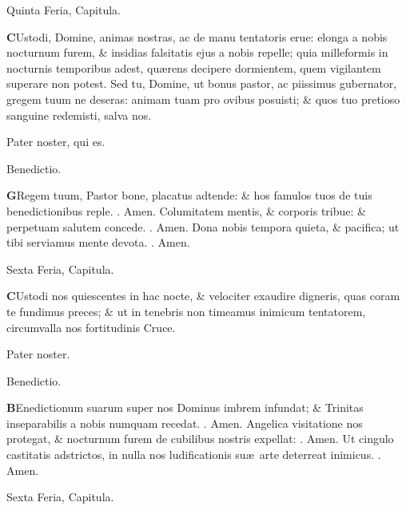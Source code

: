 \documentclass[letter,11pt]{book}
\makeatletter
\DeclareRobustCommand{\Rbar}{\vers@resp{0pt}{R}}
\newcommand{\vers@resp@sym}{\raisebox{0.2ex}{\rotatebox[origin=c]{-20}{$\m@th\rceil$}}}
\newcommand{\vers@resp}[2]{%
  {\ooalign{\hidewidth\kern#1\vers@resp@sym\hidewidth\cr#2\cr}}%
}%
\def\R{\color{Red} \Rbar . \color{black}}
\makeatother
\begin{document}
\begin{multicols*}{2}
\vspace{-.5em} \begin{center} \color{Red} Quinta Feria, Capitula. \end{center} \vspace{-.5em}
\lettrine[lines=2]{\bfseries \color{Red} C}{}Ustodi, Domine, animas nostras, ac de manu tentatoris erue: elonga a nobis nocturnum furem, \& insidias falsitatis ejus a nobis repelle; quia milleformis in nocturnis temporibus adest, qu\ae rens decipere dormientem, quem vigilantem superare non potest. Sed tu, Domine, ut bonus pastor, ac piissimus gubernator, gregem tuum ne deseras: animam tuam pro ovibus posuisti; \& quos tuo pretioso sanguine redemisti, salva nos.
\par Pater noster, qui es.
\vspace{-.5em} \begin{center} \color{Red} Benedictio. \end{center} \vspace{-.5em}
\lettrine[lines=2]{\bfseries \color{Red} G}{}Regem tuum, Pastor bone, placatus adtende: \& hos famulos tuos de tuis benedictionibus reple. \R Amen. Columitatem mentis, \& corporis tribue: \& perpetuam salutem concede. \R Amen. Dona nobis tempora quieta, \& pacifica; ut tibi serviamus mente devota. \R Amen.
\vspace{-.5em} \begin{center} \color{Red} Sexta Feria, Capitula. \end{center} \vspace{-.5em}
\lettrine[lines=2]{\bfseries \color{Red} C}{}Ustodi nos quiescentes in hac nocte, \& velociter exaudire digneris, quas coram te fundimus preces; \& ut in tenebris non
timeamus inimicum tentatorem, circumvalla nos fortitudinis Cruce.
\par Pater noster.
\vspace{-.5em} \begin{center} \color{Red} Benedictio. \end{center} \vspace{-.5em}
\lettrine[lines=2]{\bfseries \color{Red} B}{}Enedictionum suarum super nos Dominus imbrem infundat; \& Trinitas inseparabilis a nobis numquam recedat. \R Amen. Angelica visitatione nos protegat, \& nocturnum furem de cubilibus nostris expellat: \R Amen. Ut cingulo castitatis adstrictos, in nulla nos ludificationis su\ae \ arte deterreat inimicus. \R Amen.
\vspace{-.5em} \begin{center} \color{Red} Sexta Feria, Capitula. \end{center} \vspace{-.5em}

\end{multicols*}
\end{document}
